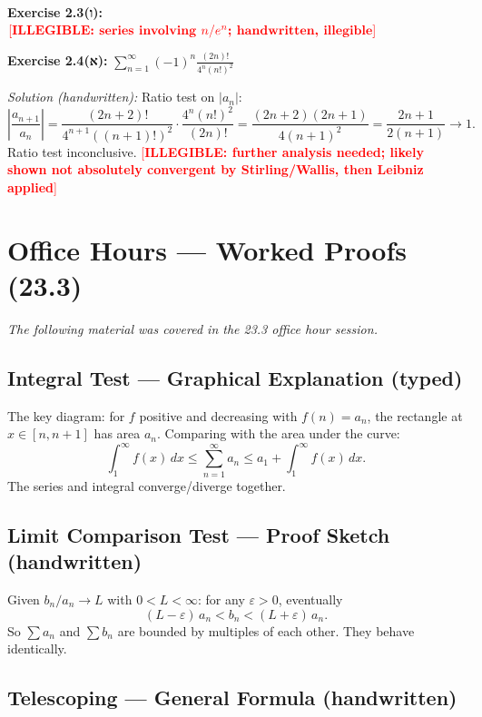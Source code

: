 \documentclass[12pt, a4paper]{article}
\newcommand{\illegible}[1][?]{\textcolor{red}{[\textbf{ILLEGIBLE: #1}]}}
\theoremstyle{definition}
\theoremstyle{remark}
\begin{document}
\bigskip
\noindent\textbf{Exercise 2.3(ו):} $\illegible[series involving $n/e^n$; handwritten, illegible]$

\bigskip
\noindent\textbf{Exercise 2.4(א):} $\displaystyle\sum_{n=1}^\infty (-1)^n \frac{(2n)!}{4^n(n!)^2}$

\textit{Solution (handwritten):} Ratio test on $|a_n|$:
\[
  \left|\frac{a_{n+1}}{a_n}\right| = \frac{(2n+2)!}{4^{n+1}((n+1)!)^2}\cdot\frac{4^n(n!)^2}{(2n)!}
  = \frac{(2n+2)(2n+1)}{4(n+1)^2} = \frac{2n+1}{2(n+1)} \to 1.
\]
Ratio test inconclusive. \illegible[further analysis needed; likely shown not absolutely convergent by Stirling/Wallis, then Leibniz applied]

\section{Office Hours --- Worked Proofs (23.3)}

\textit{The following material was covered in the 23.3 office hour session.}

\subsection{Integral Test --- Graphical Explanation (typed)}

The key diagram: for $f$ positive and decreasing with $f(n)=a_n$, the rectangle at $x\in[n,n+1]$ has area $a_n$. Comparing with the area under the curve:
\[
  \int_1^\infty f(x)\,dx \leq \sum_{n=1}^\infty a_n \leq a_1 + \int_1^\infty f(x)\,dx.
\]
The series and integral converge/diverge together.

\subsection{Limit Comparison Test --- Proof Sketch (handwritten)}

Given $b_n/a_n \to L$ with $0 < L < \infty$: for any $\varepsilon > 0$, eventually
\[
  (L-\varepsilon)\,a_n < b_n < (L+\varepsilon)\,a_n.
\]
So $\sum a_n$ and $\sum b_n$ are bounded by multiples of each other. They behave identically.

\subsection{Telescoping --- General Formula (handwritten)}
\end{document}
